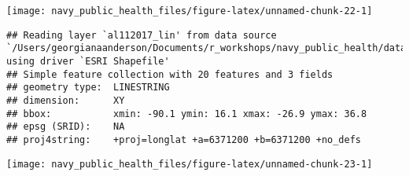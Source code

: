 \documentclass[]{tufte-book}
\newenvironment{Shaded}{}{}
\newcommand{\DataTypeTok}[1]{\textcolor[rgb]{0.56,0.13,0.00}{#1}}
\newcommand{\DecValTok}[1]{\textcolor[rgb]{0.25,0.63,0.44}{#1}}
\newcommand{\FloatTok}[1]{\textcolor[rgb]{0.25,0.63,0.44}{#1}}
\newcommand{\KeywordTok}[1]{\textcolor[rgb]{0.00,0.44,0.13}{\textbf{#1}}}
\newcommand{\NormalTok}[1]{#1}
\newcommand{\OperatorTok}[1]{\textcolor[rgb]{0.40,0.40,0.40}{#1}}
\newcommand{\StringTok}[1]{\textcolor[rgb]{0.25,0.44,0.63}{#1}}
\begin{document}
\texttt{[image: navy\_public\_health\_files/figure-latex/unnamed-chunk-22-1]}

\begin{Shaded}
\end{Shaded}

\begin{verbatim}
## Reading layer `al112017_lin' from data source `/Users/georgianaanderson/Documents/r_workshops/navy_public_health/data/al112017_best_track' using driver `ESRI Shapefile'
## Simple feature collection with 20 features and 3 fields
## geometry type:  LINESTRING
## dimension:      XY
## bbox:           xmin: -90.1 ymin: 16.1 xmax: -26.9 ymax: 36.8
## epsg (SRID):    NA
## proj4string:    +proj=longlat +a=6371200 +b=6371200 +no_defs
\end{verbatim}

\begin{Shaded}
\end{Shaded}

\texttt{[image: navy\_public\_health\_files/figure-latex/unnamed-chunk-23-1]}
\end{document}
